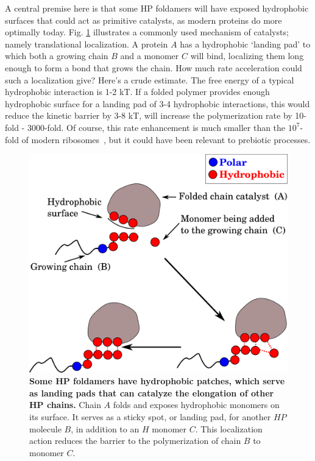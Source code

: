\documentclass[journal=jacsat,manuscript=article,layout=twocolumn]{achemso}
\begin{document}
 A central premise here is that some HP foldamers will have exposed hydrophobic surfaces that could 
act as primitive catalysts, as modern proteins do more optimally today.  Fig. \ref{fig:hp-catalysis} 
illustrates a commonly used mechanism of catalysts; namely translational localization.  A protein 
$A$ has a hydrophobic `landing pad' to which both a growing chain $B$ and a monomer $C$ will bind, 
localizing them long enough to form a bond that grows the chain.  How much rate acceleration could 
such a localization give?  Here's a crude estimate.  The free energy of a typical hydrophobic 
interaction is 1-2 kT.  If a folded polymer provides enough hydrophobic surface for a landing pad of 
3-4 hydrophobic interactions, this would reduce the kinetic barrier by 3-8 kT, will increase the 
polymerization rate by 10-fold - 3000-fold.  Of course, this rate enhancement is much smaller than 
the $10^7$-fold of modern ribosomes~\cite{Sievers2004a}, but it could have been relevant to 
prebiotic processes.
     
   \begin{figure}[h!]
  \centering
  \includegraphics[width=0.9\columnwidth]{pictures/hp-catalysis.pdf} 
  \caption{\footnotesize{\textbf{Some HP foldamers have hydrophobic patches, which serve as 
landing pads that can catalyze the elongation of other HP chains.}  Chain $A$ folds and exposes 
hydrophobic monomers on its surface.   It serves as a sticky spot, or landing pad, for another $HP$ 
molecule $B$, in addition to an $H$ monomer $C$.  This localization action reduces the barrier to 
the polymerization of chain $B$ to monomer $C$.}}
  \label{fig:hp-catalysis}
\end{figure} 
\end{document}
